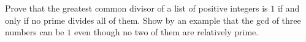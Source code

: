 Prove that the greatest common divisor of a list of positive integers is $1$ if and only if no prime divides all of them. Show by an example that the gcd of three numbers can be $1$ even though no two of them are relatively prime.
